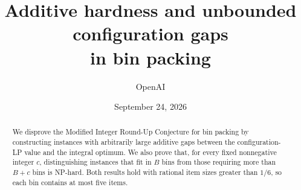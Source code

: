 \documentclass[11pt]{article}
\title{Additive hardness and unbounded configuration gaps\protect\\ in bin packing}
\author{OpenAI}
\date{September 24, 2026}
\begin{document}
\maketitle
\begin{abstract}
We disprove the Modified Integer Round-Up Conjecture for bin packing by
constructing instances with arbitrarily large additive gaps between the
configuration-LP value and the integral optimum. We also prove that, for
every fixed nonnegative integer $c$, distinguishing instances that fit
in $B$ bins from those requiring more than $B+c$ bins is NP-hard. Both
results hold with rational item sizes greater than $1/6$, so each bin
contains at most five items.
\end{abstract}







\end{document}
